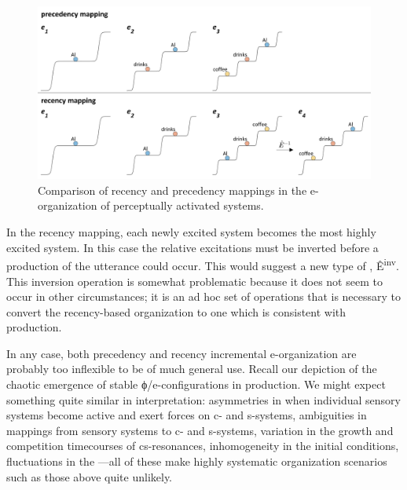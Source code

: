   
\begin{figure}
\includegraphics[width=\textwidth]{figures/Tilsen-img128.png}
\caption{Comparison of recency and precedency mappings in the e-organization of perceptually activated systems.}
\label{fig:6:9}
\end{figure}
 

  In the recency mapping, each newly excited system becomes the most highly excited system. In this case the relative excitations must be inverted before a production of the utterance could occur. This would suggest a new type of , Ê\textsuperscript{{}inv}. This inversion operation is somewhat problematic because it does not seem to occur in other circumstances; it is an ad hoc set of operations that is necessary to convert the recency-based organization to one which is consistent with production.

  In any case, both precedency and recency incremental e-organization are probably too inflexible to be of much general use. Recall our depiction of the chaotic emergence of stable ϕ/e-configurations in production. We might expect something quite similar in interpretation: asymmetries in when individual sensory systems become active and exert forces on c- and s-systems, ambiguities in mappings from sensory systems to c- and s-systems, variation in the growth and competition timecourses of cs-resonances, inhomogeneity in the initial conditions, fluctuations in the —all of these make highly systematic organization scenarios such as those above quite unlikely.

